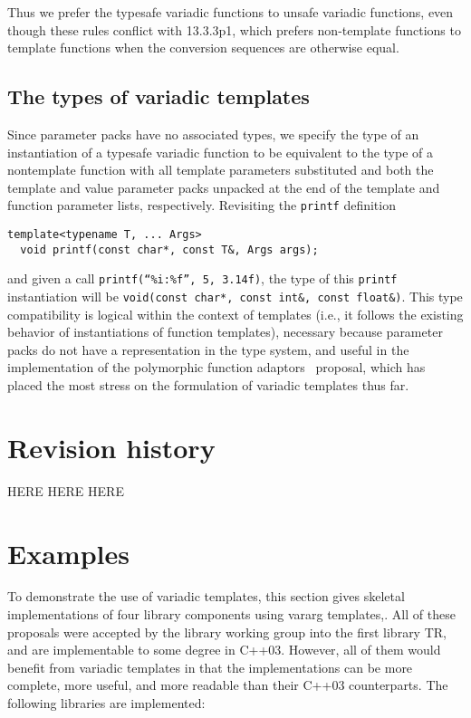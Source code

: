\documentclass{article}
\begin{document}
Thus we prefer the typesafe variadic functions to unsafe variadic
functions, even though these rules conflict with 13.3.3p1, which
prefers non-template functions to template functions when the
conversion sequences are otherwise equal.

\subsection{The types of variadic templates}
Since parameter packs have no associated types, we specify the
type of an instantiation of a typesafe variadic function to be equivalent
to the type of a nontemplate function with all template parameters
substituted and both the template and value parameter packs unpacked
at the end of the template and function parameter lists,
respectively. Revisiting the {\tt printf} definition

\begin{verbatim}
template<typename T, ... Args>
  void printf(const char*, const T&, Args args);
\end{verbatim}

and given a call {\tt printf(``\%i:\%f'', 5, 3.14f)}, the type of this
{\tt printf} instantiation will be {\tt void(const char*, const int\&,
  const float\&)}. This type compatibility is logical within the
context of templates (i.e., it follows the existing behavior of
instantiations of function templates), necessary because parameter
packs do not have a representation in the type system, and useful in the
implementation of the polymorphic function adaptors~\cite{Gregor02}
proposal, which has placed the most stress on the formulation of
variadic templates thus far.

\section{Revision history}
HERE HERE HERE

\section{Examples}
To demonstrate the use of variadic templates, this section gives
skeletal implementations of four library components using vararg
templates,. All of these proposals were accepted by the library
working group into the first library TR, and are implementable to some
degree in C++03. However, all of them would benefit from variadic
templates in that the implementations can be more complete, more
useful, and more readable than their C++03 counterparts. The following
libraries are implemented:
\end{document}
